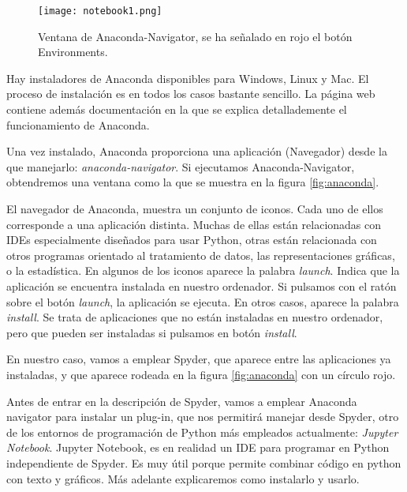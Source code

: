 \begin{figure}
\centering
    \texttt{[image: notebook1.png]}
    \caption{Ventana de Anaconda-Navigator, se ha señalado en rojo el botón Environments.}
    \label{fig:ntb1}
\end{figure}
\begin{paracol}{2}
 Hay instaladores de Anaconda disponibles para Windows, Linux y Mac. El proceso de instalación es en todos los casos bastante sencillo. La página web contiene además documentación en la que se explica detallademente el funcionamiento de Anaconda.

 Una vez instalado, Anaconda proporciona una aplicación (Navegador) desde la que manejarlo: \emph{anaconda-navigator}. Si ejecutamos Anaconda-Navigator, obtendremos una ventana como la que se muestra en la figura \ref{fig:anaconda}.

 El navegador de Anaconda, muestra un conjunto de iconos. Cada uno de ellos corresponde a una aplicación distinta. Muchas de ellas están relacionadas con IDEs especialmente diseñados para usar Python, otras están relacionada con otros programas orientado al tratamiento de datos, las representaciones gráficas, o la estadística. En algunos de los iconos aparece la palabra \emph{launch}. Indica que la aplicación se encuentra instalada en nuestro ordenador. Si pulsamos con el ratón sobre el botón \emph{launch}, la aplicación se ejecuta. En otros casos, aparece la palabra \emph{install}. Se trata de aplicaciones que no están instaladas en nuestro ordenador, pero que pueden ser instaladas si pulsamos en botón \emph{install}. 

 En nuestro caso, vamos a emplear Spyder, que aparece entre las aplicaciones ya instaladas, y que aparece rodeada en la figura \ref{fig:anaconda} con un círculo rojo.

 Antes de entrar en la descripción de Spyder, vamos a emplear Anaconda navigator para instalar un plug-in, que nos permitirá manejar desde Spyder, otro de los entornos de programación de Python más empleados actualmente: \emph{Jupyter Notebook}. Jupyter Notebook, es en realidad un IDE para programar en Python independiente de Spyder. Es muy útil porque permite combinar código en python con texto y gráficos. Más adelante explicaremos como instalarlo y usarlo.


\end{paracol}
